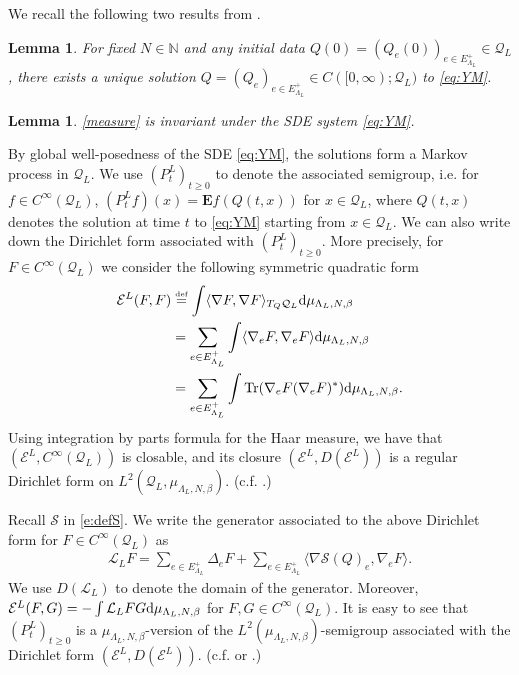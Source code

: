 \documentclass[11pt,UTF-8,reqno]{amsart}
\numberwithin{equation}{section}
\newtheorem{lemma}[theorem]{Lemma}
\def\<{{\langle}}
\def\>{{\rangle}}
\def\tr{\mathrm {tr}}
\def\dif{{\mathord{{\rm d}}}}
\newcommand{\eqdef}{\stackrel{\mbox{\tiny def}}{=}}
\def\cE{{\mathcal E}}
\def\cL{{\mathcal L}}
\def\cQ{{\mathcal Q}}
\def\cS{{\mathcal S}}
\def\mN{{\mathbb N}}
\def\E{\mathbf E}
\def\geq{\geqslant}
\def\E{\mathbf{E}}
\def\<{{\langle}}
\def\>{{\rangle}}
\def\tr{\mathrm {tr}}
\def\dif{{\mathord{{\rm d}}}}
\def\tr{{\rm Tr}}
\def\bl{\begin{lemma}}
\def\el{\end{lemma}}
\def\geq{\geqslant}
\def\<{\langle} \def\>{\rangle}
\begin{document}
We recall the following two results from \cite[Lemmas 3.2-3.3]{SSZloop}.

\bl\label{lem:exist} For fixed $N\in\mN$ and any initial data $Q(0)=(Q_e(0))_{e\in E_{\Lambda_L}^+}\in \cQ_L$, there exists a  unique solution $Q=(Q_e)_{e\in E_{\Lambda_L}^+}\in C([0,\infty);\cQ_L)$ to \eqref{eq:YM}.
\el

\begin{lemma}\label{lem:inv}
	\eqref{measure} is invariant under the SDE system \eqref{eq:YM}.
\end{lemma}

By global well-posedness of the SDE \eqref{eq:YM}, the solutions form a Markov process in $\cQ_L$. We use $(P_t^L)_{t\geq0}$ to denote the associated semigroup, i.e. for $f\in C^\infty(\cQ_L)$, $(P_t^Lf)(x)=\E f(Q(t,x))$ for $x\in \cQ_L$, where $Q(t,x)$ denotes the solution at time $t$ to \eqref{eq:YM} starting from $x\in \cQ_L$. 
We can also write down the Dirichlet form associated with $(P_t^L)_{t\geq0}$. More precisely, for $F\in C^\infty(\cQ_L)$ we consider the following  symmetric quadratic form
\begin{align*}
	\cE^L(F,F)&\eqdef\int \<\nabla F,\nabla F\>_{T_Q\cQ_L}\dif \mu_{\Lambda_{L},N,\beta}
	\\&=\sum_{e\in E_{\Lambda_{L}}^+}\int\<\nabla_{e}F,\nabla_{e} F\>\dif \mu_{\Lambda_{L},N,\beta}
	\\&=\sum_{e\in E_{\Lambda_{L}}^+}\int\tr(\nabla_{e}F(\nabla_{e} F)^*)\dif \mu_{\Lambda_{L},N,\beta}.
\end{align*}
Using integration by parts formula for the Haar measure,
we have that $(\cE^L, C^\infty(\cQ_L))$ is closable,  and its closure $(\cE^L,D(\cE^L))$ is a regular Dirichlet form on $L^2(\cQ_L,\mu_{\Lambda_L,N,\beta})$. (c.f. \cite{Fukushima}.)

Recall $\cS $ in \eqref{e:defS}.
We  write the generator associated to the above Dirichlet form for $F\in C^\infty(\cQ_L)$ as
\begin{align}\label{eq:L}
	\cL_L F=	\sum_{e\in E_{\Lambda_{L}}^+}\Delta_{e}F+\sum_{e\in E_{\Lambda_{L}}^+}\<\nabla \cS(Q)_e,\nabla_{e} F\>.
\end{align}
We  use $D(\cL_L)$ to denote the domain of the generator. Moreover, $\cE^L(F,G)=-\int \cL_L FG\dif \mu_{\Lambda_{L},N,\beta}$ for $F,G\in C^\infty(\cQ_L)$. 
It is easy to see that $(P_t^L)_{t\geq0}$ is a $\mu_{\Lambda_{L},N,\beta}$-version of the $L^2(\mu_{\Lambda_L,N,\beta})$-semigroup associated with the Dirichlet form $(\cE^L,D(\cE^L))$.  (c.f. \cite{MaRockner} or \cite{Fukushima}.)
\end{document}
